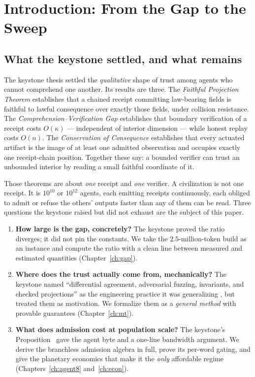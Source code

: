 \documentclass[11pt,oneside]{book}
\theoremstyle{definition}
\theoremstyle{plain}
\theoremstyle{remark}
\newcommand{\CL}{\kappa}                       %
\begin{document}
\tableofcontents

\mainmatter

\chapter{Introduction: From the Gap to the Sweep}
\label{ch:intro}

\section{What the keystone settled, and what remains}

The keystone thesis \cite{keystone} settled the \emph{qualitative} shape of trust among agents
who cannot comprehend one another. Its results are three. The \emph{Faithful Projection
Theorem} \cite[Thm.~3.2]{keystone} establishes that a chained receipt committing law-bearing
fields is faithful to lawful consequence over exactly those fields, under collision resistance.
The \emph{Comprehension--Verification Gap} \cite[Thm.~4.2]{keystone} establishes that boundary
verification of a receipt costs $O(\CL)$ --- independent of interior dimension --- while honest
replay costs $O(n)$. The \emph{Conservation of Consequence} \cite[Thm.~3.5]{keystone}
establishes that every actuated artifact is the image of at least one admitted observation and
occupies exactly one receipt-chain position. Together these say: a bounded verifier can trust an
unbounded interior by reading a small faithful coordinate of it.

Those theorems are about \emph{one} receipt and \emph{one} verifier. A civilization is not one
receipt. It is $10^{10}$ or $10^{12}$ agents, each emitting receipts continuously, each obliged
to admit or refuse the others' outputs faster than any of them can be read. Three questions the
keystone raised but did not exhaust are the subject of this paper.

\begin{enumerate}[label=(Q\arabic*),leftmargin=*]
\item \textbf{How large is the gap, concretely?} The keystone proved the ratio diverges; it did
not pin the constants. We take the $2.5$-million-token build as an instance and compute the
ratio with a clean line between measured and estimated quantities (Chapter~\ref{ch:gap}).
\item \textbf{Where does the trust actually come from, mechanically?} The keystone named
``differential agreement, adversarial fuzzing, invariants, and checked projections'' as the
engineering practice it was generalizing \cite[Ch.~1]{keystone}, but treated them as motivation.
We formalize them as a \emph{general method} with provable guarantees (Chapter~\ref{ch:mt}).
\item \textbf{What does admission cost at population scale?} The keystone's
Proposition~\cite[Prop.~6.2]{keystone} gave the agent byte and a one-line bandwidth argument.
We derive the branchless admission algebra in full, prove its per-word gating, and give the
planetary economics that make it the \emph{only} affordable regime (Chapters~\ref{ch:agent8}
and~\ref{ch:econ}).
\end{enumerate}
\end{document}
